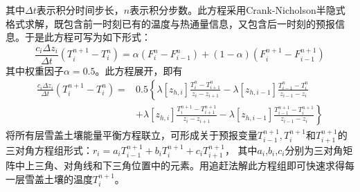 其中$\Delta t$表示积分时间步长，$n$表示积分步数。此方程采用Crank-Nicholson半隐式格式求解，既包含前一时刻已有的温度与热通量信息，又包含后一时刻的预报信息。于是此方程可写为如下形式：
\begin{equation}
\frac{c_{i} \Delta z_{i}}{\Delta t}\left(T_{i}^{n+1}-T_{i}^{n}\right)=\alpha\left(F_{i}^{n}-F_{i-1}^{n}\right)+(1-\alpha)\left(F_{i}^{n+1}-F_{i-1}^{n+1}\right)
\end{equation}
其中权重因子$\alpha=0.5$。此方程展开，即有
\begin{equation}
\begin{aligned} \frac{c_{i} \Delta z_{i}}{\Delta t}\left(T_{i}^{n+1}-T_{i}^{n}\right)=& 0.5\left\{\lambda\left[z_{h, i}\right] \frac{T_{i}^{n}-T_{i+1}^{n}}{z_{i}-z_{i+1}}-\lambda\left[z_{h, i-1}\right] \frac{T_{i-1}^{n}-T_{i}^{n}}{z_{i-1}-z_{i}}\right.\\ &\left.+\lambda\left[z_{h, i}\right] \frac{T_{i}^{n+1}-T_{i+1}^{n+1}}{z_{i}-z_{i+1}}-\lambda\left[z_{h, i-1}\right] \frac{T_{i-1}^{n+1}-T_{i}^{n+1}}{z_{i-1}-z_{i}}\right\} \end{aligned}
\end{equation}
将所有层雪盖土壤能量平衡方程联立，可形成关于预报变量$T_{i-1}^{n+1},T_i^{n+1}$和$T_{i+1}^{n+1}$的三对角方程组形式：$r_i=a_iT_{i-1}^{n+1}+b_iT_i^{n+1}+c_iT_{i+1}^{n+1}$，
其中$a_i$,$b_i$,$c_i$分别为三对角矩阵中上三角、对角线和下三角位置中的元素。用追赶法解此方程组即可快速求得每一层雪盖土壤的温度$T_i^{n+1}$。


